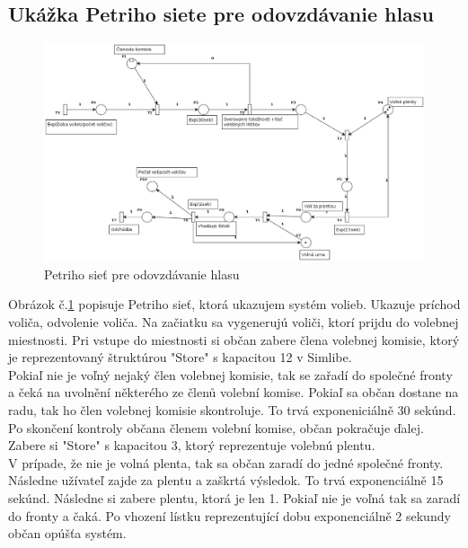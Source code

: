 \documentclass[12pt,a4paper,titlepage,final]{article}
\begin{document}
\subsection{Ukážka Petriho siete pre odovzdávanie hlasu}

\begin{figure}[h]

\begin{center}

\includegraphics[scale=0.4]{img/petri2.eps} 
\caption{Petriho sieť pre odovzdávanie hlasu}
\label{petri}

\end{center}

\end{figure}

Obrázok č.\ref{petri} popisuje Petriho sieť, ktorá ukazujem systém volieb. Ukazuje príchod voliča, odvolenie voliča. Na začiatku sa vygenerujú voliči, ktorí prijdu do volebnej miestnosti. Pri vstupe do miestnosti si občan zabere člena volebnej komisie, ktorý je reprezentovaný štruktúrou "Store" s kapacitou 12 v Simlibe. \\ Pokiaľ nie je voľný nejaký člen volebnej komisie, tak se zařadí do společné fronty a čeká na uvolnění některého ze členů volební komise. Pokiaľ sa občan dostane na radu, tak ho člen volebnej komisie skontroluje. To trvá exponeniciálně 30 sekúnd. Po skončení kontroly občana členem volební komise, občan pokračuje ďalej. Zabere si "Store" s kapacitou 3, ktorý reprezentuje volebnú plentu. \\ V prípade, že nie je volná plenta, tak sa občan zaradí do jedné společné fronty. Následne užívateľ zajde za plentu a zaškrtá výsledok. To trvá exponenciálně 15 sekúnd. Následne si zabere plentu, ktorá je len 1. Pokiaľ nie je voľná tak sa zaradí do fronty a čaká. Po vhození lístku reprezentující dobu exponenciálně 2 sekundy občan opúšťa systém.
\newpage
\end{document}
